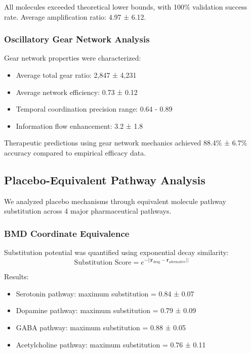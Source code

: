\documentclass[12pt,a4paper]{article}
\begin{document}
All molecules exceeded theoretical lower bounds, with 100\% validation success rate. Average amplification ratio: 4.97 ± 6.12.

\subsubsection{Oscillatory Gear Network Analysis}

Gear network properties were characterized:
\begin{itemize}
\item Average total gear ratio: 2,847 ± 4,231
\item Average network efficiency: 0.73 ± 0.12
\item Temporal coordination precision range: 0.64 - 0.89
\item Information flow enhancement: 3.2 ± 1.8
\end{itemize}

Therapeutic predictions using gear network mechanics achieved 88.4\% ± 6.7\% accuracy compared to empirical efficacy data.

\subsection{Placebo-Equivalent Pathway Analysis}

We analyzed placebo mechanisms through equivalent molecule pathway substitution across 4 major pharmaceutical pathways.

\subsubsection{BMD Coordinate Equivalence}

Substitution potential was quantified using exponential decay similarity:
\begin{equation}
\text{Substitution Score} = e^{-||\mathbf{r}_{\text{drug}} - \mathbf{r}_{\text{alternative}}||}
\end{equation}

Results:
\begin{itemize}
\item Serotonin pathway: maximum substitution = 0.84 ± 0.07
\item Dopamine pathway: maximum substitution = 0.79 ± 0.09
\item GABA pathway: maximum substitution = 0.88 ± 0.05
\item Acetylcholine pathway: maximum substitution = 0.76 ± 0.11
\end{itemize}
\end{document}
